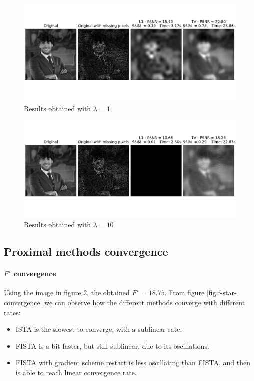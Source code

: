 \documentclass[12pt]{article}
\begin{document}
\begin{figure}[H]
    \centering
    \includegraphics[width=17cm]{hw3/codes/exercise2/results/lambda_search/me_1.pdf}
    \caption{Results obtained with $\lambda = 1$}
    \label{fig:lambda-search-1}
\end{figure}

\begin{figure}[H]
    \centering
    \includegraphics[width=17cm]{hw3/codes/exercise2/results/lambda_search/me_10.pdf}
    \caption{Results obtained with $\lambda = 10$}
    \label{fig:lambda-search-10}
\end{figure}

\subsection{Proximal methods convergence}

\paragraph{\texorpdfstring{$F^{\star}$}{Lg} convergence}
Using the image in figure \ref{fig:lambda-search-10}, the obtained $F^{\star} = 18.75$. From figure \ref{fig:f-star-convergence} we can observe how the different methods converge with different rates:
\begin{itemize}
    \item ISTA is the slowest to converge, with a sublinear rate.
    \item FISTA is a bit faster, but still sublinear, due to its oscillations.
    \item FISTA with gradient scheme restart is less oscillating than FISTA, and then is able to reach linear convergence rate.
\end{itemize}
\end{document}
